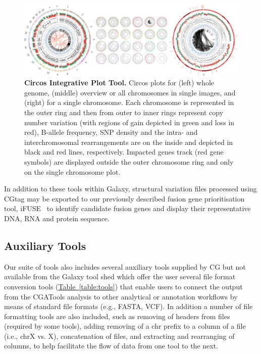 \begin{figure}[t!]
\centering
\includegraphics[scale=2]{chapters/images/cgtag/fig2-circos.png}
\caption{\textbf{Circos Integrative Plot Tool.} Circos plots for (left) whole genome, (middle) overview or all chromosomes in single images, and (right) for a single chromosome.  Each chromosome is represented in the outer ring and then from outer to inner rings represent copy number variation (with regions of gain depicted in green and loss in red), B-allele frequency, SNP density and the intra- and interchromosomal rearrangements are on the inside and depicted in black and red lines, respectively.  Impacted genes track (red gene symbols) are displayed outside the outer chromosome ring and only on the single chromosome plot.}\label{fig:circos}
\end{figure}


In addition to these tools within Galaxy, structural variation files processed using CGtag may be exported to our previously described fusion gene prioritisation tool, iFUSE~\cite{url-ifuse} to identify candidate fusion genes and display their representative DNA, RNA and protein sequence.


\subsection*{Auxiliary Tools}

Our suite of tools also includes several auxiliary tools supplied by CG but not available from the Galaxy tool shed which offer the user several file format conversion tools (\hyperref[table:tools]{Table~\ref{table:tools}}) that enable users to connect the output from the CGATools analysis to other analytical or annotation workflows by means of standard file formats (e.g., FASTA, VCF). In addition a number of file formatting tools are also included, such as removing of headers from files (required by some tools), adding removing of a chr prefix to a column of a file (i.e., chrX vs. X), concatenation of files, and extracting and rearranging of columns, to help facilitate the flow of data from one tool to the next.

